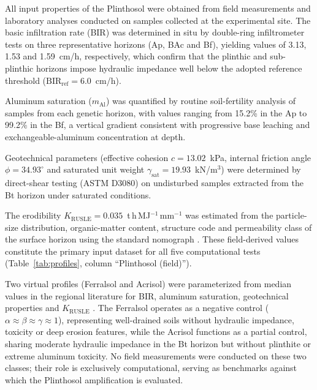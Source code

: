 \documentclass[preprint,review,12pt,authoryear]{elsarticle}
\begin{document}
All input properties of the Plinthosol were obtained from field measurements and laboratory analyses conducted on samples collected at the experimental site. The basic infiltration rate (BIR) was determined in situ by double-ring infiltrometer tests on three representative horizons (Ap, BAc and Bf), yielding values of 3.13, 1.53 and 1.59~cm/h, respectively, which confirm that the plinthic and sub-plinthic horizons impose hydraulic impedance well below the adopted reference threshold ($\mathrm{BIR_{ref}} = 6.0$~cm/h).

Aluminum saturation ($m_{\mathrm{Al}}$) was quantified by routine soil-fertility analysis of samples from each genetic horizon, with values ranging from 15.2\% in the Ap to 99.2\% in the Bf, a vertical gradient consistent with progressive base leaching and exchangeable-aluminum concentration at depth.

Geotechnical parameters (effective cohesion $c = 13.02$~kPa, internal friction angle $\phi = 34.93^\circ$ and saturated unit weight $\gamma_{\mathrm{sat}} = 19.93$~kN/m$^3$) were determined by direct-shear testing (ASTM D3080) on undisturbed samples extracted from the Bt horizon under saturated conditions.

The erodibility $K_{\mathrm{RUSLE}} = 0.035$~t\,h\,MJ$^{-1}$\,mm$^{-1}$ was estimated from the particle-size distribution, organic-matter content, structure code and permeability class of the surface horizon using the standard nomograph \citep{wischmeier_et_al_1971}. These field-derived values constitute the primary input dataset for all five computational tests (Table~\ref{tab:profiles}, column ``Plinthosol (field)'').

Two virtual profiles (Ferralsol and Acrisol) were parameterized from median values in the regional literature for BIR, aluminum saturation, geotechnical properties and $K_{\mathrm{RUSLE}}$ \citep{silva_et_al_2009,bertoni_lombardi_neto_2017}. The Ferralsol operates as a negative control ($\alpha \approx \beta \approx \gamma \approx 1$), representing well-drained soils without hydraulic impedance, toxicity or deep erosion features, while the Acrisol functions as a partial control, sharing moderate hydraulic impedance in the Bt horizon but without plinthite or extreme aluminum toxicity. No field measurements were conducted on these two classes; their role is exclusively computational, serving as benchmarks against which the Plinthosol amplification is evaluated.
\end{document}
